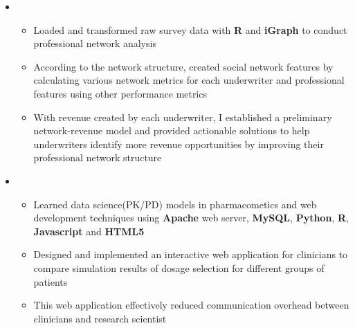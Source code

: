 \documentclass[11pt,a4paper,sans]{moderncv}        %
\begin{document}
\begin{itemize}
	\item{
		{\vspace{3pt}
			\begin{itemize}
				\item  Loaded and transformed raw survey data with \textbf{R} and \textbf{iGraph} to conduct professional network analysis 
				\item According to the network structure, created social network features by calculating various network metrics for each underwriter and professional features using other performance metrics
				\item With revenue created by each underwriter, I established a preliminary network-revenue model and provided actionable solutions to help underwriters identify more revenue opportunities by improving their professional network structure 
		    \end{itemize}}}

	\vspace{4pt}

	\item{
		{\vspace{3pt}
			\begin{itemize} pt
				\item Learned data science(PK/PD) models in pharmacometics and web development techniques using  \textbf{Apache} web server, \textbf{MySQL}, \textbf{Python}, \textbf{R}, \textbf{Javascript} and \textbf{HTML5} %
				\item %
				Designed and implemented an interactive web application for clinicians to compare simulation results of dosage selection for different groups of patients
				\item This web application effectively reduced communication overhead between clinicians and research scientist  
			\end{itemize}}}


\end{itemize}
\end{document}
